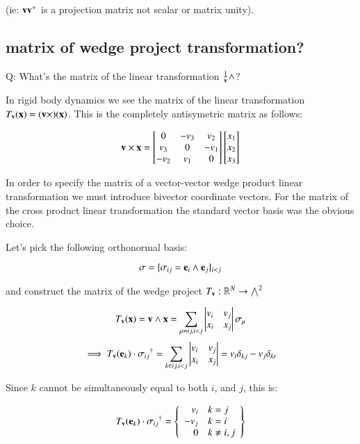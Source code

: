 \documentclass{article}      %
\begin{document}
(ie: $\mathbf{v} \mathbf{v}^{+}$ is a projection matrix not scalar or matrix unity).

\subsection{ matrix of wedge project transformation? }

Q: What's the matrix of the linear transformation $\frac{1}{\mathbf{v}} \wedge$?

In rigid body dynamics we see the matrix of the linear transformation $T_{\mathbf{v}}(\mathbf{x}) = (\mathbf{v} \times)(\mathbf{x})$.  This is the completely antisymetric matrix as follows:

\begin{equation}
\mathbf{v} \times \mathbf{x} = 
\begin{bmatrix}
0 & -v_3 & v_2 \\
v_3 & 0 & -v_1 \\
-v_2 & v_1 & 0 \\
\end{bmatrix}
\begin{bmatrix}
x_1 \\
x_2 \\
x_3 \\
\end{bmatrix}
\end{equation}

In order to specify the matrix of a vector-vector wedge product linear transformation we must introduce bivector coordinate vectors.  For the matrix of the cross product linear transformation the standard vector basis was the obvious choice.

Let's pick the following orthonormal basis:

\[
\sigma = \{ \sigma_{ij} = \mathbf{e}_i \wedge \mathbf{e}_j \}_{i<j}
\]

and construct the matrix of the wedge project $T_{\mathbf{v}} : \mathbb{R}^N \rightarrow {\bigwedge}^2$

\[
T_{\mathbf{v}}(\mathbf{x}) = \mathbf{v} \wedge \mathbf{x} = \sum_{\mu = ij, i<j} \begin{vmatrix} {v}_{i} & {v}_{j} \\ {x}_{i} & {x}_{j} \end{vmatrix} \sigma_{\mu}
\]
\[
\implies
T_\Bv(\Be_k) \cdot {\sigma_{ij}}^\dagger = 
\sum_{k \in ij, i<j} \DETuvij{v}{x}{i}{j} 
= %
v_i \delta_{kj} - v_j \delta_{ki}
\]

Since $k$ cannot be simultaneously equal to both $i$, and $j$, this is:

\[
T_{\mathbf{v}}(\mathbf{e}_k) \cdot {\sigma_{ij}}^\dagger = 
\left\{
\begin{array}{rl}
v_i & k=j \\
-v_j & k=i \\
0 & k \ne i,j \\
\end{array}
\right\}
\]
\end{document}
